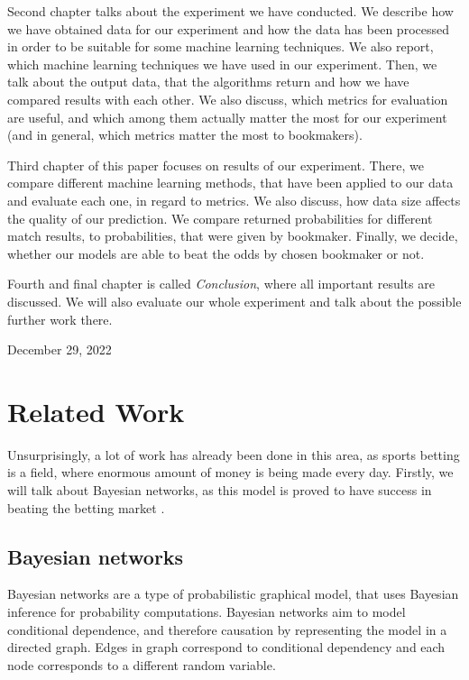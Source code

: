 \documentclass[conference]{IEEEtran}
\begin{document}
Second chapter talks about the experiment we have conducted. We describe how we have obtained 
data for our experiment and how the data has been processed in order to be suitable for some 
machine learning techniques. We also report, which machine learning techniques we have used in 
our experiment. Then, we talk about the output data, that the algorithms return and how we 
have compared results with each other. We also discuss, which metrics 
for evaluation are useful, and which among them actually matter the most for our 
experiment (and in general, which metrics matter the most to bookmakers).

Third chapter of this paper focuses on results of our experiment. There, we compare 
different machine learning methods, that have been applied to our data and 
evaluate each one, in regard to metrics. We also discuss, how data size affects the quality 
of our prediction. We compare returned probabilities for different match results, 
to probabilities, that were given by bookmaker. Finally, we decide, whether our models are 
able to beat the odds by chosen bookmaker or not.

Fourth and final chapter is called \emph{Conclusion}, where all important results are
discussed. We will also evaluate our whole experiment and talk about the possible further work 
there.
 
\hfill December 29, 2022

\section{Related Work}

Unsurprisingly, a lot of work has already been done in this area, as sports betting is a field,
where enormous amount of money is being made every day. Firstly, we will talk about 
Bayesian networks, as this model is proved to have success in beating the betting market 
\cite{Constantinou_2012}.

\subsection{Bayesian networks}

Bayesian networks are a type of probabilistic graphical model, that uses Bayesian 
inference for probability computations. Bayesian networks aim to model conditional 
dependence, and therefore causation by representing the model
in a directed graph. Edges in graph correspond to conditional dependency and 
each node corresponds to a different random variable.
\end{document}
